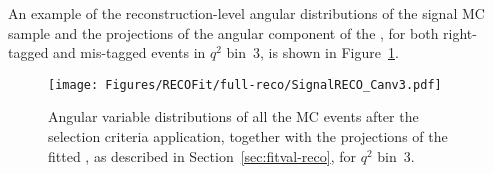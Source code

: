 An example of the reconstruction-level angular distributions of the signal MC sample and the projections of the angular component of the \pdf, for both right-tagged and mis-tagged events in $q^2$ bin~3, is shown in Figure~\ref{fig:fullreco-bin3}.







\begin{figure}[!hbt]
  \centering
  \texttt{[image: Figures/RECOFit/full-reco/SignalRECO\_Canv3.pdf]}
  \caption{Angular variable distributions of all the MC events after the selection criteria application, together with the projections of the fitted \pdf, as described in Section~\ref{sec:fitval-reco}, for $q^2$ bin~3.}
  \label{fig:fullreco-bin3}
\end{figure}




